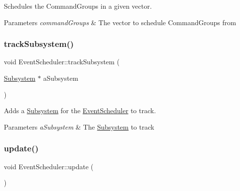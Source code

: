 Schedules the Command\+Groups in a given vector. 


\begin{DoxyParams}{Parameters}
{\em command\+Groups} & The vector to schedule Command\+Groups from \\
\hline
\end{DoxyParams}
\mbox{\label{classlib_iterative_robot_1_1_event_scheduler_a1130cfd602dec9e4091571b47b60f378}} 
\subsubsection{\texorpdfstring{trackSubsystem()}{trackSubsystem()}}
{\footnotesize\ttfamily void Event\+Scheduler\+::track\+Subsystem (\begin{DoxyParamCaption}\item[{\mbox{\hyperlink{classlib_iterative_robot_1_1_subsystem}{Subsystem}} $\ast$}]{a\+Subsystem }\end{DoxyParamCaption})}



Adds a \mbox{\hyperlink{classlib_iterative_robot_1_1_subsystem}{Subsystem}} for the \mbox{\hyperlink{classlib_iterative_robot_1_1_event_scheduler}{Event\+Scheduler}} to track. 


\begin{DoxyParams}{Parameters}
{\em a\+Subsystem} & The \mbox{\hyperlink{classlib_iterative_robot_1_1_subsystem}{Subsystem}} to track \\
\hline
\end{DoxyParams}
\mbox{\label{classlib_iterative_robot_1_1_event_scheduler_a9643c8e8dd7a87a1a3419415c7cc46bc}} 
\subsubsection{\texorpdfstring{update()}{update()}}
{\footnotesize\ttfamily void Event\+Scheduler\+::update (\begin{DoxyParamCaption}{ }\end{DoxyParamCaption})}



